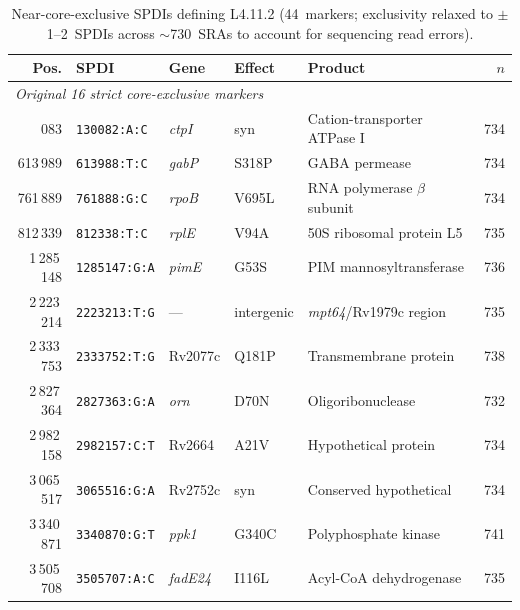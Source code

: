 \documentclass[11pt,a4paper]{article}
\newcommand{\spdi}[1]{\texttt{#1}}
\newcommand{\lignee}[1]{\textsf{#1}}
\begin{document}
\begin{table}[htbp]
	\centering
	\caption{Near-core-exclusive SPDIs defining \lignee{L4.11.2}
		(44~markers; exclusivity relaxed to $\pm$1--2~SPDIs across
		$\sim$730~SRAs to account for sequencing read errors).}
	\label{tab:l4112}
	\scriptsize
	\begin{tabular}{rllllr}
		\toprule
		\textbf{Pos.} & \textbf{SPDI}      & \textbf{Gene}        & \textbf{Effect} & \textbf{Product}                  & \textbf{$n$} \\
		\midrule
		\multicolumn{6}{l}{\textit{Original 16 strict core-exclusive markers}} \\
		\addlinespace
		130\,083      & \spdi{130082:A:C}  & \textit{ctpI}        & syn             & Cation-transporter ATPase I       & 734 \\
		613\,989      & \spdi{613988:T:C}  & \textit{gabP}        & S318P           & GABA permease                     & 734 \\
		761\,889      & \spdi{761888:G:C}  & \textit{rpoB}        & V695L           & RNA polymerase $\beta$ subunit    & 734 \\
		812\,339      & \spdi{812338:T:C}  & \textit{rplE}        & V94A            & 50S ribosomal protein L5          & 735 \\
		1\,285\,148   & \spdi{1285147:G:A} & \textit{pimE}        & G53S            & PIM mannosyltransferase           & 736 \\
		2\,223\,214   & \spdi{2223213:T:G} & ---                  & intergenic      & \textit{mpt64}/Rv1979c region     & 735 \\
		2\,333\,753   & \spdi{2333752:T:G} & Rv2077c              & Q181P           & Transmembrane protein             & 738 \\
		2\,827\,364   & \spdi{2827363:G:A} & \textit{orn}         & D70N            & Oligoribonuclease                 & 732 \\
		2\,982\,158   & \spdi{2982157:C:T} & Rv2664               & A21V            & Hypothetical protein              & 734 \\
		3\,065\,517   & \spdi{3065516:G:A} & Rv2752c              & syn             & Conserved hypothetical            & 734 \\
		3\,340\,871   & \spdi{3340870:G:T} & \textit{ppk1}        & G340C           & Polyphosphate kinase              & 741 \\
		3\,505\,708   & \spdi{3505707:A:C} & \textit{fadE24}      & I116L           & Acyl-CoA dehydrogenase            & 735 \\

\end{tabular}
\end{table}
\end{document}
